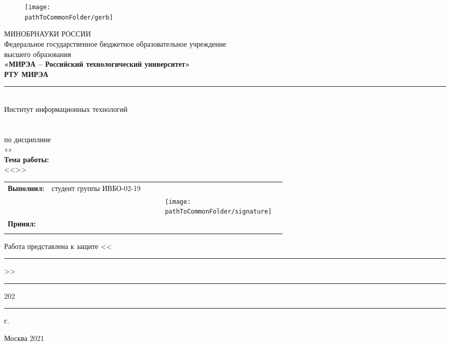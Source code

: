 

\begin{center}
	\begin{figure}[h!]
		\begin{center}
			\vspace{-10ex}
		\texttt{[image: \\pathToCommonFolder/gerb]}
		\end{center}
	\end{figure}
 	\small	МИНОБРНАУКИ РОССИИ \\
	Федеральное государственное бюджетное образовательное учреждение\\
						высшего образования\\
\normalsize					
\textbf{«МИРЭА – Российский технологический университет»\\
						РТУ МИРЭА}\\
						\noindent\rule{1\linewidth}{1pt}\\
       Институт информационных технологий\\ %
					\kafedra\\
		\vspace{3ex}
			\large \textbf{\workname}  \\
						по дисциплине\\ «\discipline» \\
		\vspace{3ex}
		\if \withouttheme
			\textbf{Тема работы:}\\ <<\theme>>
		\fi
\vspace{6ex}
\small
\begin{table}[h!]
\begin{tabular}{lp{0.43\linewidth}p{0.2\linewidth}l}
	\textbf{Выполнил:} & студент группы ИВБО-02-19 & \\ 
	& & %
		\hfill \texttt{[image: \\pathToCommonFolder/signature]} &

	 \studentfio \\%
	\textbf{Принял:} & \rang & \\
	& & & \hfill \teacherfio\\
\end{tabular}
\end{table}
\end{center}
\begin{flushleft}
Работа представлена к защите <<\rule{3ex}{1pt}>>\rule{10ex}{1pt} 202\rule{1ex}{1pt} г.\hfill
\end{flushleft}
\normalsize
\begin{center}
	\vfill
Москва 2021
\end{center}
